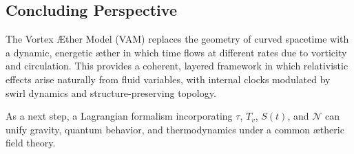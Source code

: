 \subsection{Concluding Perspective}

The Vortex Æther Model (VAM) replaces the geometry of curved spacetime with a dynamic, energetic æther in which time flows at different rates due to vorticity and circulation. This provides a coherent, layered framework in which relativistic effects arise naturally from fluid variables, with internal clocks modulated by swirl dynamics and structure-preserving topology.

As a next step, a Lagrangian formalism incorporating \( \tau \), \( T_v \), \( S(t) \), and \( \mathcal{N} \) can unify gravity, quantum behavior, and thermodynamics under a common ætheric field theory.

